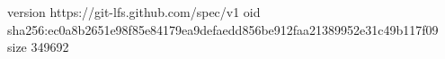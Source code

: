 version https://git-lfs.github.com/spec/v1
oid sha256:ec0a8b2651e98f85e84179ea9defaedd856be912faa21389952e31c49b117f09
size 349692
